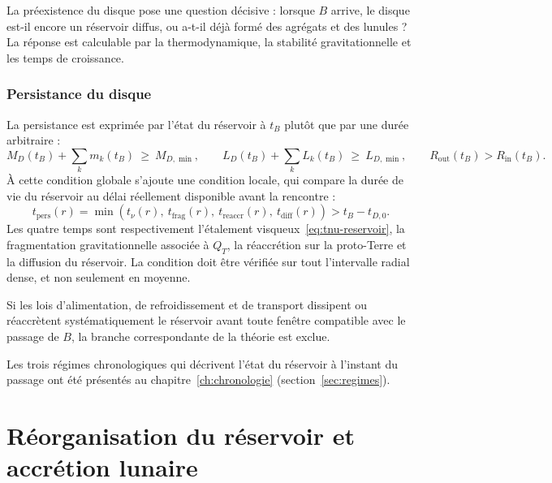 \documentclass[11pt,a4paper,openany]{report}
\begin{document}
\begin{ideephys}
La préexistence du disque pose une question décisive : lorsque $B$ arrive, le disque est-il
encore un réservoir diffus, ou a-t-il déjà formé des agrégats et des lunules ? La réponse est
calculable par la thermodynamique, la stabilité gravitationnelle et les temps de croissance.
\end{ideephys}

\subsection{Persistance du disque}

La persistance est exprimée par l'état du réservoir à $t_B$ plutôt que par une durée arbitraire :
\begin{equation}
M_D(t_B)+\sum_k m_k(t_B)\ \ge\ M_{D,\min},\qquad
L_D(t_B)+\sum_k L_k(t_B)\ \ge\ L_{D,\min},\qquad
R_{\mathrm{out}}(t_B)>R_{\mathrm{in}}(t_B).
\label{eq:persistance}
\end{equation}
À cette condition globale s'ajoute une condition locale, qui compare la durée de vie du réservoir au
délai réellement disponible avant la rencontre :
\begin{equation}
\boxed{\;
t_{\mathrm{pers}}(r)=
\min\!\left(t_\nu(r),\ t_{\mathrm{frag}}(r),\ t_{\mathrm{reaccr}}(r),\ t_{\mathrm{diff}}(r)\right)
>t_B-t_{D,0}.
\;}
\label{eq:tpers}
\end{equation}
Les quatre temps sont respectivement l'étalement visqueux~\eqref{eq:tnu-reservoir}, la
fragmentation gravitationnelle associée à $Q_T$, la réaccrétion sur la proto-Terre et la diffusion
du réservoir. La condition doit être vérifiée sur tout l'intervalle radial dense, et non seulement
en moyenne.

\begin{falsif}
Si les lois d'alimentation, de refroidissement et de transport dissipent ou réaccrètent
systématiquement le réservoir avant toute fenêtre compatible avec le passage de $B$, la branche
correspondante de la théorie est exclue.
\end{falsif}


Les trois régimes chronologiques qui décrivent l'état du réservoir à l'instant du passage ont été
présentés au chapitre~\ref{ch:chronologie} (section~\ref{sec:regimes}).

\chapter{Réorganisation du réservoir et accrétion lunaire}
\label{ch:reorganisation}
\end{document}
